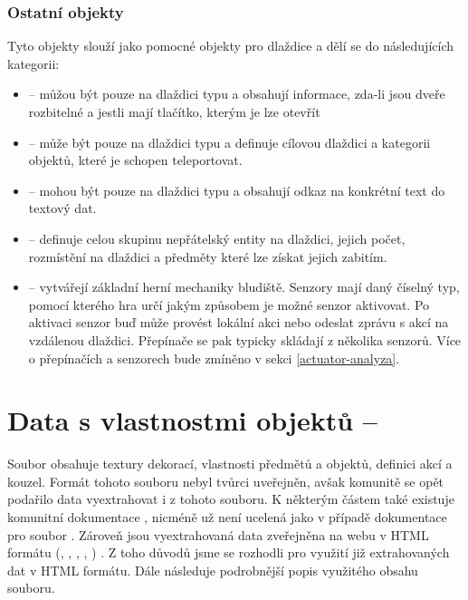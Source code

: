 \subsubsection{Ostatní objekty}
Tyto objekty slouží jako pomocné objekty pro dlaždice a dělí se do následujících kategorii:

\begin{itemize}
\item {} -- můžou být pouze na dlaždici typu  a obsahují informace, zda-li jsou dveře rozbitelné a jestli 
	mají tlačítko, kterým je lze otevřít
\item {} -- může být pouze na dlaždici typu  a definuje cílovou dlaždici a kategorii objektů, které je schopen teleportovat.
\item {} -- mohou být pouze na dlaždici typu  a obsahují odkaz na konkrétní text do textový dat.
\item {} -- definuje celou skupinu nepřátelský entity na dlaždici, jejich počet, rozmístění na dlaždici a předměty které lze získat jejich zabitím.
\item {} -- vytvářejí základní herní mechaniky bludiště. Senzory mají daný číselný typ, pomocí kterého hra 
	určí jakým způsobem je možné senzor
	aktivovat. Po aktivaci senzor buď může provést lokální akci nebo odeslat zprávu s akcí na vzdálenou 
	dlaždici. Přepínače se pak typicky skládají z několika senzorů. Více o přepínačích a senzorech bude zmíněno
	v sekci \ref{actuator-analyza}. 
\end{itemize}

\section{Data s vlastnostmi objektů -- }\label{dungeon-properties}

Soubor  obsahuje textury dekorací, vlastnosti předmětů a objektů, definici akcí a kouzel.
Formát tohoto souboru nebyl tvůrci uveřejněn, avšak komunitě se opět podařilo data
vyextrahovat i z tohoto souboru. K některým částem také existuje komunitní dokumentace \cite{DMGraphicsDAT}, 
nicméně už není ucelená jako v případě dokumentace pro soubor . Zároveň 
jsou vyextrahovaná data zveřejněna na webu v HTML formátu (\cite{DMActions}, \cite{DMItems}, \cite{DMItemDescriptors}, \cite{DMSpells}, \cite{DMCreatures}) . Z toho důvodů jsme se rozhodli 
pro využití již extrahovaných dat v HTML formátu. Dále následuje podrobnější popis využitého obsahu souboru.

